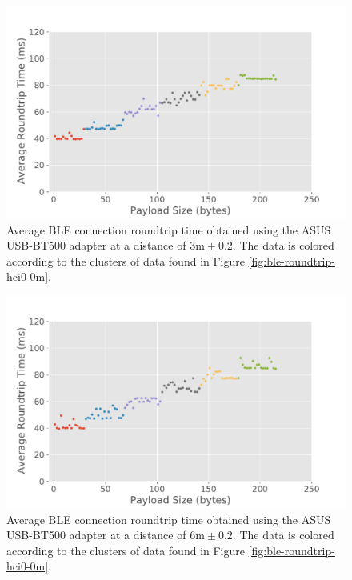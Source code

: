 \begin{figure}[H]
    \centering
    \includegraphics[width=0.75\linewidth]{images/ble-roundtrip-hci0-300cm.pdf}
    \caption[Average \acs{BLE} connection roundtrip time obtained using the ASUS USB-BT500 adapter at a distance of 3m.]{Average \acs{BLE} connection roundtrip time obtained using the ASUS USB-BT500 adapter at a distance of $3\text{m} \pm 0.2$. The data is colored according to the clusters of data found in Figure \ref{fig:ble-roundtrip-hci0-0m}.}
    \label{fig:ble-roundtrip-hci0-3m}
\end{figure}

\begin{figure}[H]
    \centering
    \includegraphics[width=0.75\linewidth]{images/ble-roundtrip-hci0-600cm.pdf}
    \caption[Average \acs{BLE} connection roundtrip time obtained using the ASUS USB-BT500 adapter at a distance of 6m.]{Average \acs{BLE} connection roundtrip time obtained using the ASUS USB-BT500 adapter at a distance of $6\text{m} \pm 0.2$. The data is colored according to the clusters of data found in Figure \ref{fig:ble-roundtrip-hci0-0m}.}
    \label{fig:ble-roundtrip-hci0-6m}
\end{figure}

